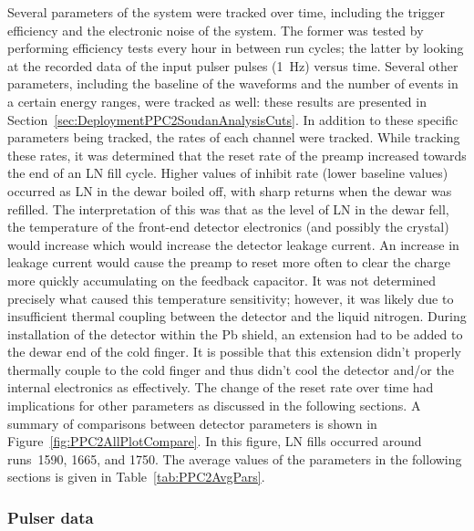 	Several parameters of the system were tracked over time, including the trigger efficiency and the electronic noise of the system.  The former was tested by performing efficiency tests every hour in between run cycles; the latter by looking at the recorded data of the input pulser pulses (1~Hz) versus time.  Several other parameters, including the baseline of the waveforms and the number of events in a certain energy ranges, were tracked as well: these results are presented in Section~\ref{sec:DeploymentPPC2SoudanAnalysisCuts}.  In addition to these specific parameters being tracked, the rates of each channel were tracked.  While tracking these rates, it was determined that the reset rate of the preamp increased towards the end of an LN fill cycle.  Higher values of inhibit rate (lower baseline values) occurred as LN in the dewar boiled off, with sharp returns when the dewar was refilled.  The interpretation of this was that as the level of LN in the dewar fell, the temperature of the front-end detector electronics (and possibly the crystal) would increase which would increase the detector leakage current.  An increase in leakage current would cause the preamp to reset more often to clear the charge more quickly accumulating on the feedback capacitor.  It was not determined precisely what caused this temperature sensitivity; however, it was likely due to insufficient thermal coupling between the detector and the liquid nitrogen.  During installation of the detector within the Pb shield, an extension had to be added to the dewar end of the cold finger.  It is possible that this extension didn't properly thermally couple to the cold finger and thus didn't cool the detector and/or the internal electronics as effectively.  The change of the reset rate over time had implications for other parameters as discussed in the following sections.  A summary of comparisons between detector parameters is shown in Figure~\ref{fig:PPC2AllPlotCompare}.  In this figure, LN fills occurred around runs~1590, 1665, and 1750.  The average values of the parameters in the following sections is given in Table~\ref{tab:PPC2AvgPars}.
	
	

		    	\subsubsection{Pulser data}
			\label{sec:DeploymentPPC2SoudanAnalysisPulserData}    

